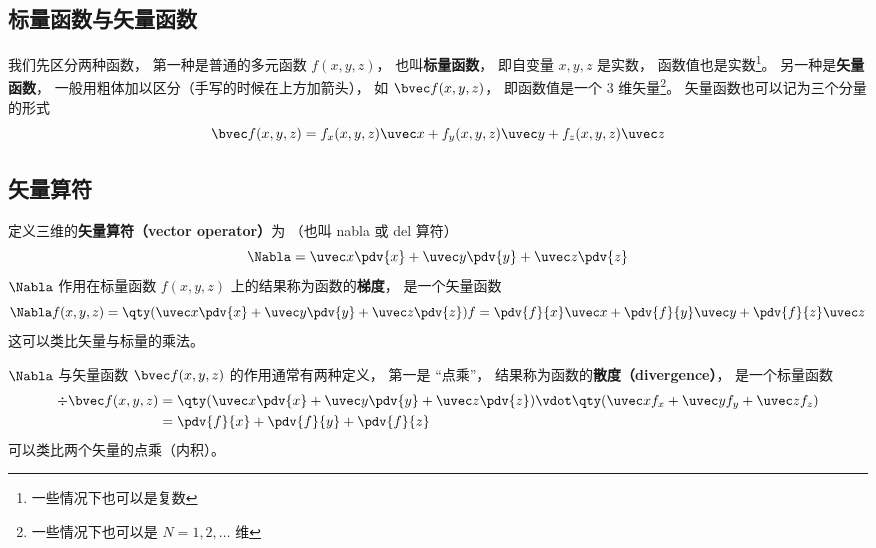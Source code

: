 

\subsection{标量函数与矢量函数}
我们先区分两种函数， 第一种是普通的多元函数 $f(x, y, z)$， 也叫\textbf{标量函数}， 即自变量 $x, y, z$ 是实数， 函数值也是实数\footnote{一些情况下也可以是复数}。 另一种是\textbf{矢量函数}， 一般用粗体加以区分（手写的时候在上方加箭头）， 如 $\bvec f(x, y, z)$， 即函数值是一个 3 维矢量\footnote{一些情况下也可以是 $N = 1, 2, \dots$ 维}。 矢量函数也可以记为三个分量的形式
\begin{equation}
\bvec f(x, y, z) = f_x(x, y, z) \uvec x + f_y(x, y, z) \uvec y + f_z(x, y, z) \uvec z
\end{equation}

\subsection{矢量算符}
定义三维的\textbf{矢量算符（vector operator）}为 （也叫 nabla 或 del 算符）
\begin{equation}
\Nabla = \uvec x \pdv{x} + \uvec y \pdv{y} + \uvec z \pdv{z}
\end{equation}
$\Nabla$ 作用在标量函数 $f(x, y, z)$ 上的结果称为函数的\textbf{梯度}， 是一个矢量函数
\begin{equation}\label{eq_VecOp_2}
\Nabla f(x, y, z) = \qty(\uvec x \pdv{x} + \uvec y \pdv{y} + \uvec z \pdv{z}) f = \pdv{f}{x} \uvec x + \pdv{f}{y} \uvec y + \pdv{f}{z} \uvec z
\end{equation}
这可以类比矢量与标量的乘法。

$\Nabla$ 与矢量函数 $\bvec f(x, y, z)$ 的作用通常有两种定义， 第一是 “点乘”， 结果称为函数的\textbf{散度（divergence）}， 是一个标量函数
\begin{equation}\label{eq_VecOp_1}
\begin{aligned}
\div \bvec f(x, y, z) &= \qty(\uvec x \pdv{x} + \uvec y \pdv{y} + \uvec z \pdv{z}) \vdot \qty(\uvec x f_x + \uvec y f_y + \uvec z f_z)\\
&= \pdv{f}{x} + \pdv{f}{y} + \pdv{f}{z}
\end{aligned}
\end{equation}
可以类比两个矢量的点乘（内积）。

